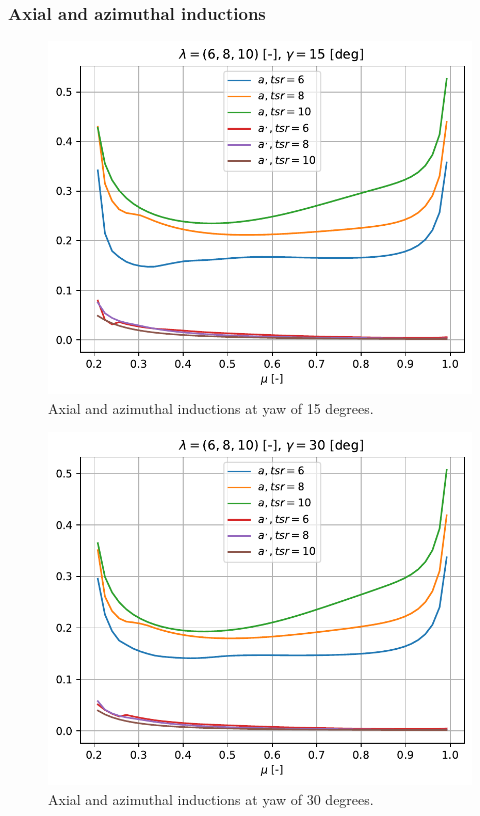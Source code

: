 \subsubsection{\textbf{Axial and azimuthal inductions} }
\begin{figure}[htbp]
	\centering
	\includegraphics[height=0.45\textheight]{./img/yaw/a_aip-yaw_15.pdf}
	\caption{Axial and azimuthal inductions at yaw of 15 degrees.}
	\label{img:yaw-aap-15}
\end{figure}
\begin{figure}[htbp]
	\centering
	\includegraphics[height=0.45\textheight]{./img/yaw/a_aip-yaw_30.pdf}
	\caption{Axial and azimuthal inductions at yaw of 30 degrees.}
	\label{img:yaw-aap-30}
\end{figure}

